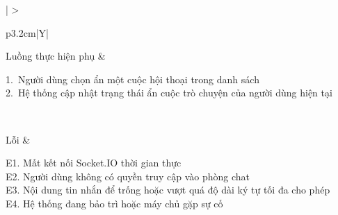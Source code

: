 \begin{table}[H]
\begin{tabularx}{\textwidth}{|
        >{\bfseries\raggedright\arraybackslash}p{3.2cm}|Y|}
        Luồng thực hiện phụ &
        \parbox[t]{\hsize}{
            1.\ Người dùng chọn ẩn một cuộc hội thoại trong danh sách\\
            2.\ Hệ thống cập nhật trạng thái ẩn cuộc trò chuyện của người dùng hiện tại
        }\\
        \hline

        Lỗi &
        \parbox[t]{\hsize}{
            E1. Mất kết nối Socket.IO thời gian thực\\
            E2. Người dùng không có quyền truy cập vào phòng chat\\
            E3. Nội dung tin nhắn để trống hoặc vượt quá độ dài ký tự tối đa cho phép\\
            E4. Hệ thống đang bảo trì hoặc máy chủ gặp sự cố
        }\\
        \hline

    \end{tabularx}

    \caption{Use case CV-3.1: Nhắn tin trao đổi trực tiếp}
    \label{tab:usecase-cv31}
\end{table}

